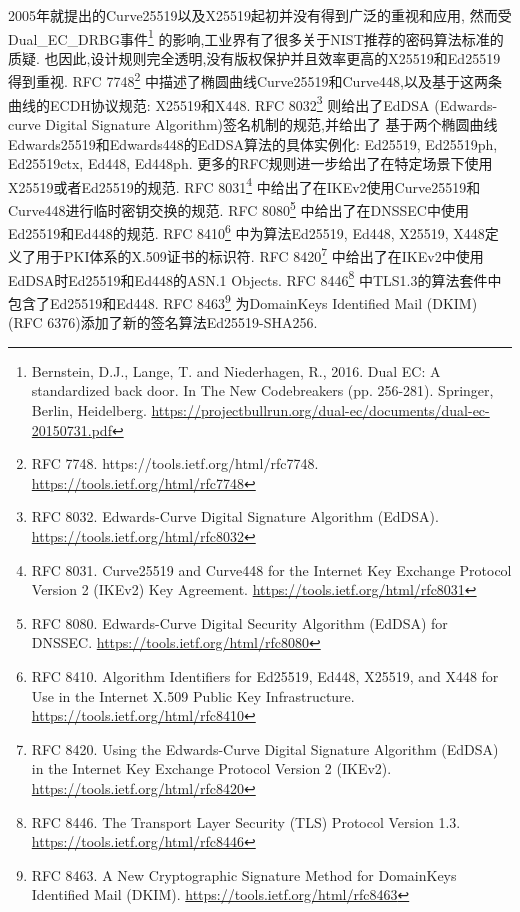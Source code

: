 \documentclass{article}
\begin{document}
2005年就提出的Curve25519以及X25519起初并没有得到广泛的重视和应用,
然而受Dual_EC_DRBG事件\footnote{
Bernstein, D.J., Lange, T. and Niederhagen, R., 2016. Dual EC: A standardized back door. In The New Codebreakers (pp. 256-281). Springer, Berlin, Heidelberg.
\url{https://projectbullrun.org/dual-ec/documents/dual-ec-20150731.pdf}}
的影响,工业界有了很多关于NIST推荐的密码算法标准的质疑.
也因此,设计规则完全透明,没有版权保护并且效率更高的X25519和Ed25519得到重视.
RFC 7748\footnote{
RFC 7748. https://tools.ietf.org/html/rfc7748.
\url{https://tools.ietf.org/html/rfc7748}
}
中描述了椭圆曲线Curve25519和Curve448,以及基于这两条曲线的ECDH协议规范: X25519和X448.
RFC 8032\footnote{
RFC 8032. Edwards-Curve Digital Signature Algorithm (EdDSA).
\url{https://tools.ietf.org/html/rfc8032}
}
则给出了EdDSA (Edwards-curve Digital Signature Algorithm)签名机制的规范,并给出了
基于两个椭圆曲线Edwards25519和Edwards448的EdDSA算法的具体实例化: 
Ed25519, Ed25519ph, Ed25519ctx, Ed448, Ed448ph.
更多的RFC规则进一步给出了在特定场景下使用X25519或者Ed25519的规范.
RFC 8031\footnote{
RFC 8031. Curve25519 and Curve448 for the Internet Key Exchange Protocol Version 2 (IKEv2) Key Agreement. 
\url{https://tools.ietf.org/html/rfc8031}
}
中给出了在IKEv2使用Curve25519和Curve448进行临时密钥交换的规范.
RFC 8080\footnote{
RFC 8080. Edwards-Curve Digital Security Algorithm (EdDSA) for DNSSEC. 
\url{https://tools.ietf.org/html/rfc8080}
}
中给出了在DNSSEC中使用Ed25519和Ed448的规范.
RFC 8410\footnote{
RFC 8410. Algorithm Identifiers for Ed25519, Ed448, X25519, and X448 for Use in the Internet X.509 Public Key Infrastructure.
\url{https://tools.ietf.org/html/rfc8410}
}
中为算法Ed25519, Ed448, X25519, X448定义了用于PKI体系的X.509证书的标识符.
RFC 8420\footnote{
RFC 8420. Using the Edwards-Curve Digital Signature Algorithm (EdDSA) in the Internet Key Exchange Protocol Version 2 (IKEv2).
\url{https://tools.ietf.org/html/rfc8420}
}
中给出了在IKEv2中使用EdDSA时Ed25519和Ed448的ASN.1 Objects.
RFC 8446\footnote{
RFC 8446. The Transport Layer Security (TLS) Protocol Version 1.3.
\url{https://tools.ietf.org/html/rfc8446}
}
中TLS1.3的算法套件中包含了Ed25519和Ed448.
RFC 8463\footnote{
RFC 8463. A New Cryptographic Signature Method for DomainKeys Identified Mail (DKIM).
\url{https://tools.ietf.org/html/rfc8463}
}
为DomainKeys Identified Mail (DKIM) (RFC 6376)添加了新的签名算法Ed25519-SHA256.

%


\end{document}
